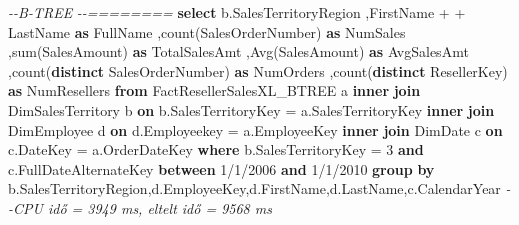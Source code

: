 \documentclass[
  magyar,
]{article}
\newenvironment{Shaded}{}{}
\newcommand{\CommentTok}[1]{\textcolor[rgb]{0.38,0.63,0.69}{\textit{#1}}}
\newcommand{\DecValTok}[1]{\textcolor[rgb]{0.25,0.63,0.44}{#1}}
\newcommand{\FunctionTok}[1]{\textcolor[rgb]{0.02,0.16,0.49}{#1}}
\newcommand{\KeywordTok}[1]{\textcolor[rgb]{0.00,0.44,0.13}{\textbf{#1}}}
\newcommand{\NormalTok}[1]{#1}
\newcommand{\OperatorTok}[1]{\textcolor[rgb]{0.40,0.40,0.40}{#1}}
\newcommand{\StringTok}[1]{\textcolor[rgb]{0.25,0.44,0.63}{#1}}
\begin{document}
\begin{Shaded}
\begin{Highlighting}[]
\CommentTok{{-}{-}B{-}TREE}
\CommentTok{{-}{-}========}
\KeywordTok{select}\NormalTok{ b.SalesTerritoryRegion}
\NormalTok{  ,FirstName }\OperatorTok{+} \StringTok{\textquotesingle{} \textquotesingle{}} \OperatorTok{+}\NormalTok{ LastName }\KeywordTok{as}\NormalTok{ FullName}
\NormalTok{  ,}\FunctionTok{count}\NormalTok{(SalesOrderNumber) }\KeywordTok{as}\NormalTok{ NumSales}
\NormalTok{  ,}\FunctionTok{sum}\NormalTok{(SalesAmount) }\KeywordTok{as}\NormalTok{ TotalSalesAmt}
\NormalTok{  ,}\FunctionTok{Avg}\NormalTok{(SalesAmount) }\KeywordTok{as}\NormalTok{ AvgSalesAmt}
\NormalTok{  ,}\FunctionTok{count}\NormalTok{(}\KeywordTok{distinct}\NormalTok{ SalesOrderNumber) }\KeywordTok{as}\NormalTok{ NumOrders}
\NormalTok{  ,}\FunctionTok{count}\NormalTok{(}\KeywordTok{distinct}\NormalTok{ ResellerKey) }\KeywordTok{as}\NormalTok{ NumResellers}
\KeywordTok{from}\NormalTok{ FactResellerSalesXL\_BTREE a}
\KeywordTok{inner} \KeywordTok{join}\NormalTok{ DimSalesTerritory b }\KeywordTok{on}\NormalTok{ b.SalesTerritoryKey }\OperatorTok{=}\NormalTok{ a.SalesTerritoryKey}
\KeywordTok{inner} \KeywordTok{join}\NormalTok{ DimEmployee d }\KeywordTok{on}\NormalTok{ d.Employeekey }\OperatorTok{=}\NormalTok{ a.EmployeeKey}
\KeywordTok{inner} \KeywordTok{join}\NormalTok{ DimDate c }\KeywordTok{on}\NormalTok{ c.DateKey }\OperatorTok{=}\NormalTok{ a.OrderDateKey}
\KeywordTok{where}\NormalTok{ b.SalesTerritoryKey }\OperatorTok{=} \DecValTok{3} \KeywordTok{and}\NormalTok{ c.FullDateAlternateKey }\KeywordTok{between} \StringTok{\textquotesingle{}1/1/2006\textquotesingle{}} \KeywordTok{and}
\StringTok{\textquotesingle{}1/1/2010\textquotesingle{}}
\KeywordTok{group} \KeywordTok{by}\NormalTok{ b.SalesTerritoryRegion,d.EmployeeKey,d.FirstName,d.LastName,c.CalendarYear}
\CommentTok{{-}{-}CPU idő = 3949 ms, eltelt idő = 9568 ms}


\end{Highlighting}
\end{Shaded}
\end{document}

